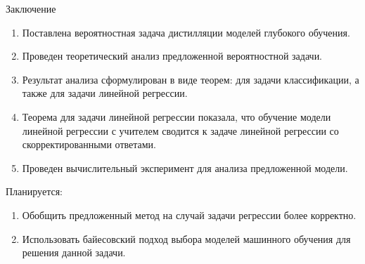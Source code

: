 \documentclass[10pt,pdf,hyperref={unicode}]{beamer}
\begin{document}
\begin{frame}{Заключение}
\justifying
	\begin{enumerate}
	\justifying
		\item Поставлена вероятностная задача дистилляции моделей глубокого обучения.
		\item Проведен теоретический анализ предложенной вероятностной задачи.
		\item Результат анализа сформулирован в виде теорем: для задачи классификации, а также для задачи линейной регрессии.
		\item Теорема для задачи линейной регрессии показала, что обучение модели линейной регрессии с учителем сводится к задаче линейной регрессии со скорректированными ответами.
		\item Проведен вычислительный эксперимент для анализа предложенной модели.
	\end{enumerate}

Планируется:
	\begin{enumerate}
	\justifying
		\item Обобщить предложенный метод на случай задачи регрессии более корректно.
		\item Использовать байесовский подход выбора моделей машинного обучения для решения данной задачи.
	\end{enumerate}	

\end{frame}
\end{document}

